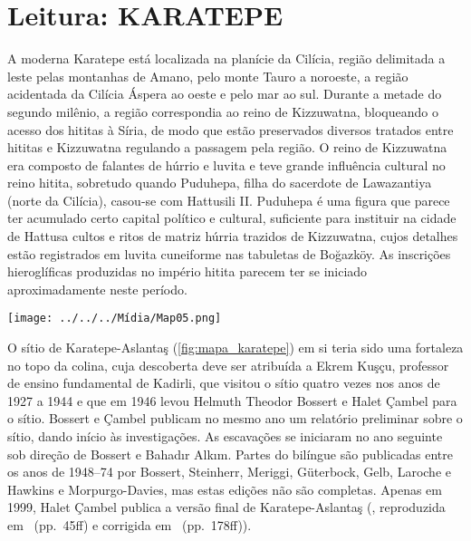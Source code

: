 \chapter{Leitura: KARATEPE}

A moderna Karatepe está localizada na planície da Cilícia, região delimitada a
leste pelas montanhas de Amano, pelo monte Tauro a noroeste, a região
acidentada da Cilícia Áspera ao oeste e pelo mar ao sul.
Durante a metade do segundo milênio, a região correspondia ao reino
de Kizzuwatna, bloqueando o acesso dos hititas à Síria, de
modo que estão preservados diversos tratados entre hititas e Kizzuwatna
regulando a passagem pela região.
O reino de Kizzuwatna era composto de falantes de húrrio e luvita e teve grande
influência cultural no reino hitita, sobretudo quando Puduhepa, filha do
sacerdote de Lawazantiya (norte da Cilícia), casou-se com Hattusili II\@.
Puduhepa é uma figura que parece ter acumulado certo capital político e
cultural, suficiente para instituir na cidade de Hattusa cultos e ritos de
matriz húrria trazidos de Kizzuwatna, cujos detalhes estão registrados em luvita
cuneiforme nas tabuletas de Boğazköy.
As inscrições hieroglíficas produzidas no império hitita parecem ter se iniciado
aproximadamente neste período.

\begin{center}
	\texttt{[image: ../../../Mídia/Map05.png]}
\end{center}

O sítio de Karatepe-Aslantaş (\autoref{fig:mapa_karatepe}) em si teria sido uma fortaleza no topo da colina,
cuja descoberta deve ser atribuída a Ekrem Kuşçu, professor de ensino
fundamental de Kadirli, que visitou o sítio quatro vezes nos anos de 1927 a
1944 e que em 1946 levou Helmuth Theodor Bossert e Halet Çambel para o sítio.
Bossert e Çambel publicam no mesmo ano um relatório preliminar sobre o sítio,
dando início às investigações. As escavações se iniciaram no ano seguinte sob
direção de Bossert e Bahadır Alkım.
Partes do bilíngue são publicadas entre os anos de 1948--74 por Bossert,
Steinherr, Meriggi, Güterbock, Gelb, Laroche e Hawkins e Morpurgo-Davies,
mas estas edições não são completas. Apenas em 1999, Halet
Çambel publica a versão final de Karatepe-Aslantaş (,
reproduzida em~ (pp.\ 45ff) e corrigida
em~ (pp.\ 178ff)).


